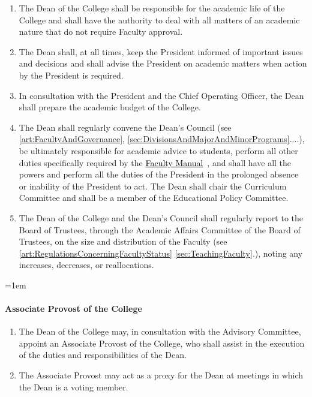 \documentclass{manual}
\newcommand{\keyword}[1]{\textcolor{black}{#1}}
\newcommand{\facman}{\keyword{\underline{Faculty Manual}}~}
\let\oldparagraph\paragraph
\renewcommand\paragraph{\leftskip=1em\oldparagraph}
\newcommand{\itemLevelA}{\alph*.}
\newcommand{\itemRefA}{\alph*}
\begin{document}
\begin{enumerate}[label=\itemLevelA,ref=\itemRefA]
\item The Dean of the College shall be responsible for the academic life of the College and shall have the authority to deal with all matters of an academic nature that do not require Faculty approval.
\item The Dean shall, at all times, keep the President informed of important issues and decisions and shall advise the President on academic matters when action by the President is required.
\item In consultation with the President and the Chief Operating Officer, the Dean shall prepare the academic budget of the College.
\item The Dean shall regularly convene the Dean's Council (see \cref{art:FacultyAndGovernance}, \cref{sec:DivisionsAndMajorAndMinorPrograms}....), be ultimately responsible for academic advice to students, perform all other duties specifically required by the \facman, and shall have all the powers and perform all the duties of the President in the prolonged absence or inability of the President to act. The Dean shall chair the Curriculum Committee and shall be a member of the Educational Policy Committee.
\item The Dean of the College and the Dean's Council shall regularly report to the Board of Trustees, through the Academic Affairs Committee of the Board of Trustees, on the size and distribution of the Faculty (see \cref{art:RegulationsConcerningFacultyStatus} \cref{sec:TeachingFaculty}.), noting any increases, decreases, or reallocations.
\end{enumerate}

\paragraph{Associate Provost of the College}
\begin{enumerate}[label=\itemLevelA,ref=\itemRefA]
\item The Dean of the College may,  in consultation with the Advisory Committee, appoint an Associate Provost of the College, who shall assist in the execution of the duties and responsibilities of the Dean.
\item The Associate Provost may act as a proxy for the Dean at meetings in which the Dean is a voting member.
\end{enumerate}
\end{document}
